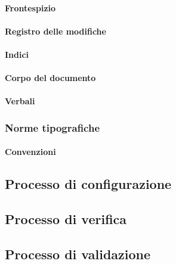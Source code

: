 \paragraph{Frontespizio}

\paragraph{Registro delle modifiche}

\paragraph{Indici}

\paragraph{Corpo del documento}

\paragraph{Verbali}

\subsubsection{Norme tipografiche}

\paragraph{Convenzioni}





\subsection{Processo di configurazione}

\subsection{Processo di verifica}

\subsection{Processo di validazione}